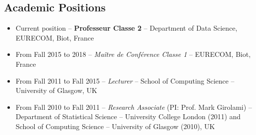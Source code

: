 \documentclass[oneside, a4paper, onecolumn, 10pt]{article}
\begin{document}
	 

\subsection*{Academic Positions}

	
                          
\begin{itemize}
\item Current position -- {\bf Professeur Classe 2} -- %
  Department of Data Science, EURECOM, Biot, France %




\item From Fall 2015 to 2018 -- {\em Ma\^{i}tre de Conf\'{e}rence Classe 1} -- %
  EURECOM, Biot, France %

\item From Fall 2011 to Fall 2015 -- {\em Lecturer} -- %
  School of Computing Science -- University of Glasgow, UK %

\item From Fall 2010 to Fall 2011 -- {\em Research Associate} (PI: Prof. Mark Girolami) -- %
  Department of Statistical Science -- University College London (2011) %
  and %
  School of Computing Science -- University of Glasgow (2010), UK %
  

\end{itemize}
\end{document}
